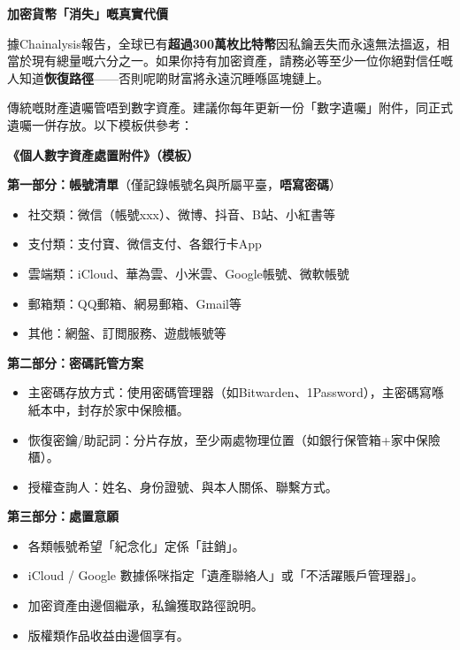 \textbf{加密貨幣「消失」嘅真實代價}\par

據Chainalysis報告，全球已有\textbf{超過300萬枚比特幣}因私鑰丟失而永遠無法搵返，相當於現有總量嘅六分之一。如果你持有加密資產，請務必等至少一位你絕對信任嘅人知道\textbf{恢復路徑}——否則呢啲財富將永遠沉睡喺區塊鏈上。


傳統嘅財產遺囑管唔到數字資產。建議你每年更新一份「數字遺囑」附件，同正式遺囑一併存放。以下模板供參考：

\textbf{《個人數字資產處置附件》（模板）}\par

\textbf{第一部分：帳號清單}（僅記錄帳號名與所屬平臺，\textbf{唔寫密碼}）

\begin{itemize}
  \item 社交類：微信（帳號xxx）、微博、抖音、B站、小紅書等
  \item 支付類：支付寶、微信支付、各銀行卡App
  \item 雲端類：iCloud、華為雲、小米雲、Google帳號、微軟帳號
  \item 郵箱類：QQ郵箱、網易郵箱、Gmail等
  \item 其他：網盤、訂閲服務、遊戲帳號等
\end{itemize}

\textbf{第二部分：密碼託管方案}

\begin{itemize}
  \item 主密碼存放方式：使用密碼管理器（如Bitwarden、1Password），主密碼寫喺紙本中，封存於家中保險櫃。
  \item 恢復密鑰/助記詞：分片存放，至少兩處物理位置（如銀行保管箱+家中保險櫃）。
  \item 授權查詢人：姓名、身份證號、與本人關係、聯繫方式。
\end{itemize}

\textbf{第三部分：處置意願}

\begin{itemize}
  \item 各類帳號希望「紀念化」定係「註銷」。
  \item iCloud / Google 數據係咪指定「遺產聯絡人」或「不活躍賬戶管理器」。
  \item 加密資產由邊個繼承，私鑰獲取路徑說明。
  \item 版權類作品收益由邊個享有。
\end{itemize}

